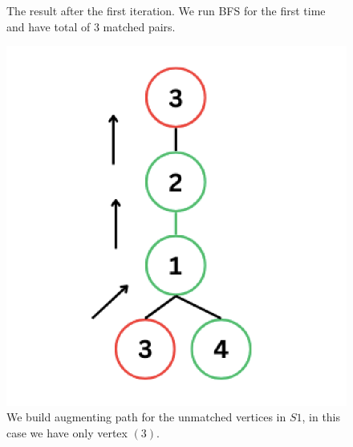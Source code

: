 \documentclass{article}
\begin{document}
\begin{enumerate}
\begin{figure}[H]
\begin{minipage}{0.3\textwidth}
            \caption{The result after the first iteration. We run BFS for the first time and have total of 3 matched pairs.}
        \end{minipage}
    \end{figure}

    \begin{figure}[H]
        \centering
        \begin{minipage}{0.3\textwidth}
            \centering
            \includegraphics[width=\textwidth]{image4.png}
            \caption{We build augmenting path for the unmatched vertices in $S1$, in this case we have only vertex $(3)$.}
        \end{minipage}
        \hspace{0.5cm}
        \begin{minipage}{0.3\textwidth}
            \centering

\end{minipage}
\end{figure}
\end{enumerate}
\end{document}
